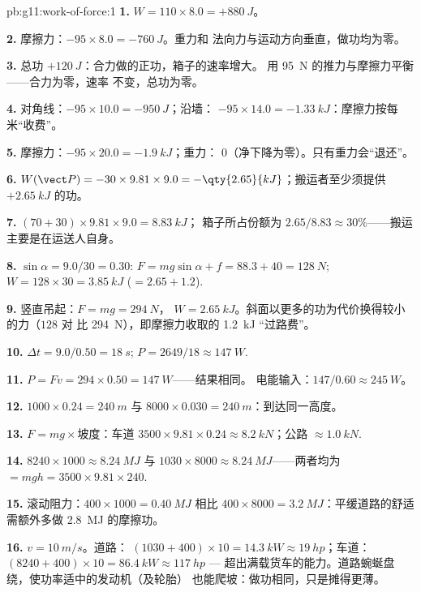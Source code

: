 \begin{solution}{pb:g11:work-of-force:1}
\textbf{1.} $W = 110 \times 8.0 = +\qty{880}{J}$。

\textbf{2.} 摩擦力：$-95 \times 8.0 = -\qty{760}{J}$。重力和
法向力与运动方向垂直，做功均为零。

\textbf{3.} 总功 $+\qty{120}{J}$：合力做的正功，箱子的速率增大。
用 \qty{95}{N} 的推力与摩擦力平衡——合力为零，速率
不变，总功为零。

\textbf{4.} 对角线：$-95 \times 10.0 = -\qty{950}{J}$；沿墙：
$-95 \times 14.0 = -\qty{1.33}{kJ}$：摩擦力按每米“收费”。

\textbf{5.} 摩擦力：$-95 \times 20.0 = -\qty{1.9}{kJ}$；重力：
$0$（净下降为零）。只有重力会“退还”。

\textbf{6.} $W(\vect P) = -30 \times 9.81 \times 9.0 =
-\qty{2.65}{kJ}$；搬运者至少须提供 $+\qty{2.65}{kJ}$ 的功。

\textbf{7.} $(70 + 30) \times 9.81 \times 9.0 = \qty{8.83}{kJ}$；
箱子所占份额为 $2.65/8.83 \approx 30\%$——搬运
主要是在运送人自身。

\textbf{8.} $\sin\alpha = 9.0/30 = 0.30$:
$F = mg\sin\alpha + f = 88.3 + 40 = \qty{128}{N}$;
$W = 128 \times 30 = \qty{3.85}{kJ}$ ($= 2.65 + 1.2$).

\textbf{9.} 竖直吊起：$F = mg = \qty{294}{N}$，
$W = \qty{2.65}{kJ}$。斜面以更多的功为代价换得较小的力（$128$ 对
比 \qty{294}{N}），即摩擦力收取的 \qty{1.2}{kJ}
“过路费”。

\textbf{10.} $\Delta t = 9.0/0.50 = \qty{18}{s}$;
$P = 2649/18 \approx \qty{147}{W}$.

\textbf{11.} $P = Fv = 294 \times 0.50 = \qty{147}{W}$——结果相同。
电能输入：$147/0.60 \approx \qty{245}{W}$。

\textbf{12.} $1000 \times 0.24 = \qty{240}{m}$ 与
$8000 \times 0.030 = \qty{240}{m}$：到达同一高度。

\textbf{13.} $F = mg \times \text{坡度}$：车道
$3500 \times 9.81 \times 0.24 \approx \qty{8.2}{kN}$；公路
$\approx \qty{1.0}{kN}$.

\textbf{14.} $8240 \times 1000 \approx \qty{8.24}{MJ}$ 与
$1030 \times 8000 \approx \qty{8.24}{MJ}$——两者均为 $= mgh = 3500
\times 9.81 \times 240$.

\textbf{15.} 滚动阻力：$400 \times 1000 = \qty{0.40}{MJ}$
相比 $400 \times 8000 = \qty{3.2}{MJ}$：平缓道路的舒适
需额外多做 \qty{2.8}{MJ} 的摩擦功。

\textbf{16.} $v = \qty{10}{m/s}$。道路：
$(1030 + 400) \times 10 = \qty{14.3}{kW} \approx \qty{19}{hp}$；车道：
$(8240 + 400) \times 10 = \qty{86.4}{kW} \approx \qty{117}{hp}$ ---
超出满载货车的能力。道路蜿蜒盘绕，使功率适中的发动机（及轮胎）
也能爬坡：做功相同，只是摊得更薄。


\end{solution}
